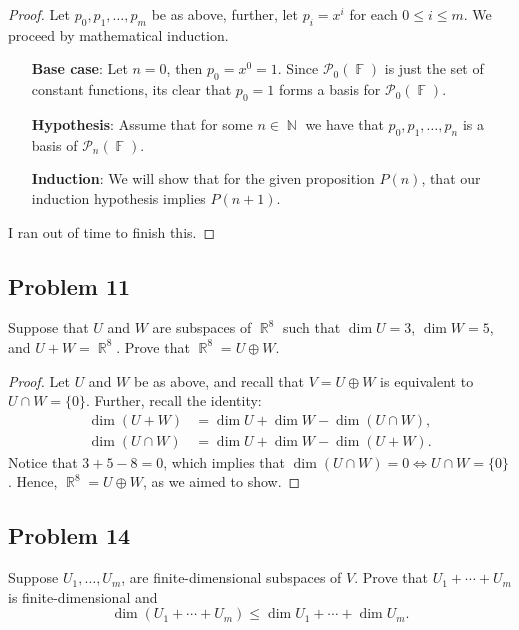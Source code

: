 \documentclass[letterpaper, 12pt]{amsart}
\DeclareMathOperator{\N}{\mathbb{N}}				%
\DeclareMathOperator{\R}{\mathbb{R}}				%
\DeclareMathOperator{\F}{\mathbb{F}}				%
\theoremstyle{definition}  							%
\begin{document}
		\begin{proof}
		Let $p_{0}, p_{1}, \dots, p_{m}$ be as above, further, let $p_{i} = x^{i}$ for each $0 \leq i \leq m$.
		We proceed by mathematical induction.
			\begin{enumerate}
				\item[\textbf{Base case}:] Let $n = 0$, then $p_{0} = x^{0} = 1$.
				Since $\mathcal{P}_{0}(\F)$ is just the set of constant functions, its clear that $p_{0} = 1$ forms a basis for $\mathcal{P}_{0}(\F)$.

				\item[\textbf{Hypothesis}:] Assume that for some $n \in \N$ we have that $p_{0}, p_{1}, \dots, p_{n}$ is a basis of $\mathcal{P}_{n}(\F)$.

				\item[\textbf{Induction}:] We will show that for the given proposition $P(n)$, that our induction hypothesis implies $P(n+1)$.
			\end{enumerate}

		I ran out of time to finish this.
		\end{proof}

		\subsection*{Problem 11}
		Suppose that $U$ and $W$ are subspaces of $\R^{8}$ such that $\dim U = 3$, $\dim W = 5$, and $U + W = \R^{8}$. 
		Prove that $\R^{8} = U \oplus W$.

		\begin{proof}
		Let $U$ and $W$ be as above, and recall that $V = U \oplus W$ is equivalent to $U \cap W = \{ 0 \}$.
		Further, recall the identity:
			\begin{align*}
				\dim(U + W) &= \dim U + \dim W - \dim(U \cap W), \\
				\dim(U \cap W) &= \dim U + \dim W - \dim(U + W).
			\end{align*}
		Notice that $3 + 5 - 8 = 0$, which implies that $\dim(U \cap W) = 0 \iff U \cap W = \{ 0 \}$.
		Hence, $\R^{8} = U \oplus W$, as we aimed to show.	
		\end{proof}

		\subsection*{Problem 14}
		Suppose $U_{1}, \dots, U_{m}$, are finite-dimensional subspaces of $V$.
		Prove that $U_{1} + \cdots + U_{m}$ is finite-dimensional and $$\dim(U_{1} + \cdots + U_{m}) \leq \dim U_{1} + \cdots + \dim U_{m}.$$
\end{document}
